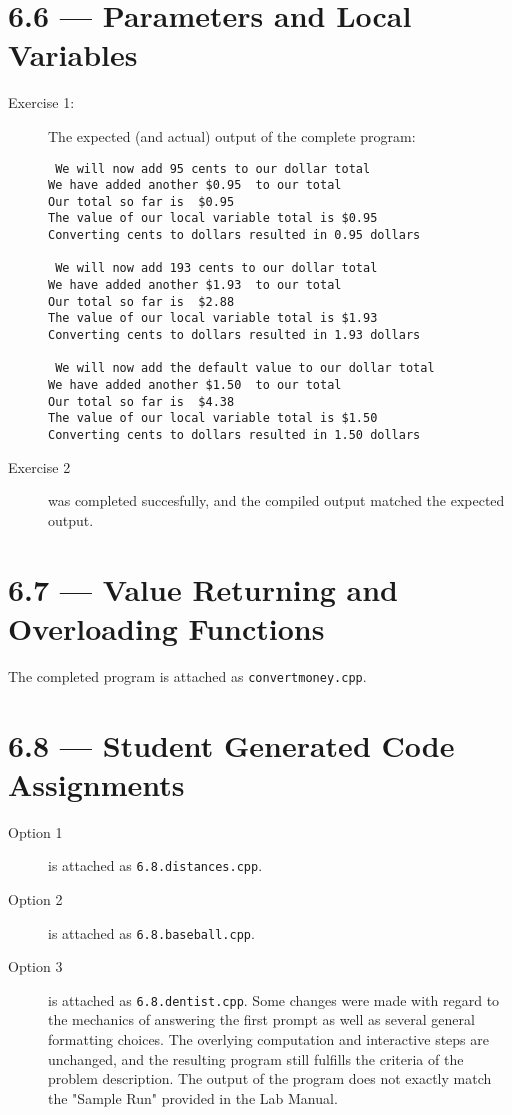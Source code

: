 \documentclass[11pt]{article}
\begin{document}
\newpage

\section*{6.6 --- Parameters and Local Variables}
\begin{description}

    \item[Exercise 1:] The expected (and actual) output of the complete program:
\begin{verbatim}
 We will now add 95 cents to our dollar total
We have added another $0.95  to our total
Our total so far is  $0.95
The value of our local variable total is $0.95
Converting cents to dollars resulted in 0.95 dollars

 We will now add 193 cents to our dollar total
We have added another $1.93  to our total
Our total so far is  $2.88
The value of our local variable total is $1.93
Converting cents to dollars resulted in 1.93 dollars

 We will now add the default value to our dollar total
We have added another $1.50  to our total
Our total so far is  $4.38
The value of our local variable total is $1.50
Converting cents to dollars resulted in 1.50 dollars
\end{verbatim}

    \item[Exercise 2] was completed succesfully, and the compiled output matched the expected output.

\end{description}

\section*{6.7 --- Value Returning and Overloading Functions}
    The completed program is attached as \texttt{convertmoney.cpp}.

\section*{6.8 --- Student Generated Code Assignments}
\begin{description}

    \item[Option 1] is attached as \texttt{6.8.distances.cpp}.

    \item[Option 2] is attached as \texttt{6.8.baseball.cpp}.

    \item[Option 3] is attached as \texttt{6.8.dentist.cpp}. Some changes were made with regard to the mechanics of answering the first prompt as well as several general formatting choices. The overlying computation and interactive steps are unchanged, and the resulting program still fulfills the criteria of the problem description. The output of the program does not exactly match the "Sample Run" provided in the Lab Manual.

\end{description}
\end{document}
